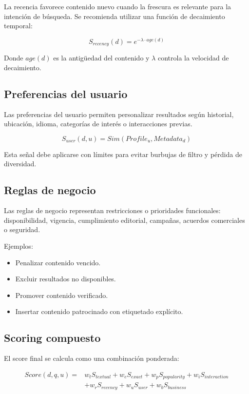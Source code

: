\documentclass[12pt,a4paper]{article}
\begin{document}
La recencia favorece contenido nuevo cuando la frescura es relevante para la intención de búsqueda. Se recomienda utilizar una función de decaimiento temporal:

\[
S_{recency}(d) = e^{-\lambda \cdot age(d)}
\]

Donde $age(d)$ es la antigüedad del contenido y $\lambda$ controla la velocidad de decaimiento.

\subsection{Preferencias del usuario}

Las preferencias del usuario permiten personalizar resultados según historial, ubicación, idioma, categorías de interés o interacciones previas.

\[
S_{user}(d,u) = Sim(Profile_u, Metadata_d)
\]

Esta señal debe aplicarse con límites para evitar burbujas de filtro y pérdida de diversidad.

\subsection{Reglas de negocio}

Las reglas de negocio representan restricciones o prioridades funcionales: disponibilidad, vigencia, cumplimiento editorial, campañas, acuerdos comerciales o seguridad.

Ejemplos:

\begin{itemize}[noitemsep]
    \item Penalizar contenido vencido.
    \item Excluir resultados no disponibles.
    \item Promover contenido verificado.
    \item Insertar contenido patrocinado con etiquetado explícito.
\end{itemize}

\subsection{Scoring compuesto}

El score final se calcula como una combinación ponderada:

\[
\begin{aligned}
Score(d,q,u) ={}&
w_t S_{textual} +
w_e S_{exact} +
w_p S_{popularity} +
w_i S_{interaction} \\
&+
w_r S_{recency} +
w_u S_{user} +
w_b S_{business}
\end{aligned}
\]
\end{document}

